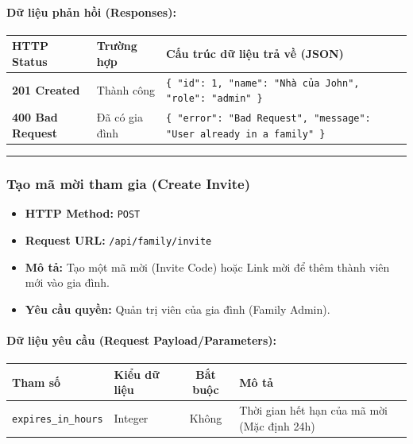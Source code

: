 \documentclass[12pt,a4paper]{article}
\begin{document}
\paragraph{Dữ liệu phản hồi (Responses):}
\begin{longtable}{|>{\raggedright\arraybackslash}p{2.8cm}|>{\raggedright\arraybackslash}p{3.2cm}|>{\raggedright\arraybackslash}p{8.0cm}|}
\hline
\textbf{HTTP Status} & \textbf{Trường hợp} & \textbf{Cấu trúc dữ liệu trả về (JSON)} \\ \hline
\endhead
\textbf{201 Created} & Thành công & \texttt{\{ "id": 1, "name": "Nhà của John", "role": "admin" \}} \\ \hline
\textbf{400 Bad Request} & Đã có gia đình & \texttt{\{ "error": "Bad Request", "message": "User already in a family" \}} \\ \hline
\end{longtable}

\vskip 0.4cm
\noindent\rule{\textwidth}{0.3pt}
\vskip 0.4cm

\subsubsection{Tạo mã mời tham gia (Create Invite)}
\begin{itemize}[leftmargin=*]
    \item \textbf{HTTP Method:} \texttt{POST}
    \item \textbf{Request URL:} \texttt{/api/family/invite}
    \item \textbf{Mô tả:} Tạo một mã mời (Invite Code) hoặc Link mời để thêm thành viên mới vào gia đình.
    \item \textbf{Yêu cầu quyền:} Quản trị viên của gia đình (Family Admin).
\end{itemize}

\paragraph{Dữ liệu yêu cầu (Request Payload/Parameters):}
\begin{longtable}{|>{\raggedright\arraybackslash}p{2.8cm}|>{\raggedright\arraybackslash}p{2.2cm}|c|>{\raggedright\arraybackslash}p{7.0cm}|}
\hline
\textbf{Tham số} & \textbf{Kiểu dữ liệu} & \textbf{Bắt buộc} & \textbf{Mô tả} \\ \hline
\endhead
\texttt{expires\_in\_hours} & Integer & Không & Thời gian hết hạn của mã mời (Mặc định 24h) \\ \hline
\end{longtable}
\end{document}
